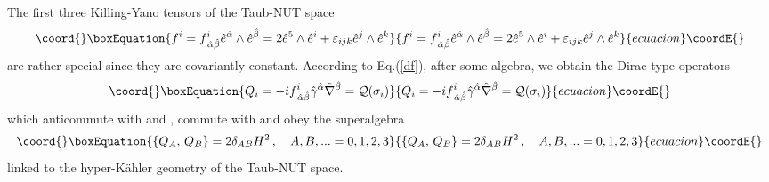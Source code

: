 \documentclass[a4paper,12pt]{article}
\begin{document}
The first three Killing-Yano tensors of the Taub-NUT space \cite{GRFH}
\begin{equation}\coord{}\boxEquation{\label{fi}
f^i 
= f^i_{\,{\hat \alpha}{\hat \beta}} {\hat e}^{\hat \alpha} \wedge 
{\hat e}^{\hat \beta}
= 2 {\hat e}^5\wedge  {\hat e}^i +\varepsilon_{ijk} {\hat e}^j\wedge 
{\hat e}^k
}{f^i 
= f^i_{\,{\hat \alpha}{\hat \beta}} {\hat e}^{\hat \alpha} \wedge 
{\hat e}^{\hat \beta}
= 2 {\hat e}^5\wedge  {\hat e}^i +\varepsilon_{ijk} {\hat e}^j\wedge 
{\hat e}^k
}{ecuacion}\coordE{}\end{equation}
are rather special since they are covariantly constant. According to 
Eq.(\ref{df}), after some algebra, we obtain the Dirac-type operators  
\begin{equation}\coord{}\boxEquation{
Q_{i}=-if^{i}_{\,\hat\alpha\hat\beta}\hat\gamma^{\hat\alpha}\hat\nabla
^{\hat\beta}={\cal Q}(\sigma_{i})
}{
Q_{i}=-if^{i}_{\,\hat\alpha\hat\beta}\hat\gamma^{\hat\alpha}\hat\nabla
^{\hat\beta}={\cal Q}(\sigma_{i})
}{ecuacion}\coordE{}\end{equation}
which anticommute with \coordHE{} and \coordHE{}, commute with \coordHE{} and 
obey the \coordHE{} superalgebra 
\begin{equation}\coord{}\boxEquation{\label{QQH}
\{Q_{A},\,Q_{B}\}=2\delta_{AB}H^2\,, \quad A,B,...=0,1,2,3
}{\{Q_{A},\,Q_{B}\}=2\delta_{AB}H^2\,, \quad A,B,...=0,1,2,3
}{ecuacion}\coordE{}\end{equation}  
linked to the hyper-K\" ahler geometry of the Taub-NUT space.
\end{document}
